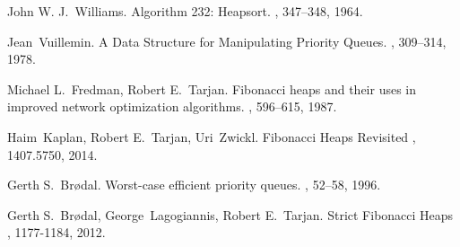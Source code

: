 \documentclass[11pt]{article}
\begin{document}


\begin{thebibliography}{42}

John W. J.~Williams.
\newblock Algorithm 232: Heapsort.
, 347--348, 1964.

Jean~Vuillemin.
\newblock A Data Structure for Manipulating Priority Queues.
, 309--314, 1978.

Michael L.~Fredman, Robert E.~Tarjan.
\newblock  Fibonacci heaps and their uses in improved network optimization algorithms.
, 596--615, 1987.

Haim~Kaplan, Robert E.~Tarjan, Uri~Zwickl.
\newblock  Fibonacci Heaps Revisited
, 1407.5750, 2014.

Gerth S.~Br{\o}dal.
\newblock  Worst-case efficient priority queues.
, 52--58, 1996.

Gerth S.~Br{\o}dal, George~Lagogiannis, Robert E.~Tarjan.
\newblock  Strict Fibonacci Heaps
, 1177-1184, 2012.

\end{thebibliography}
\end{document}
